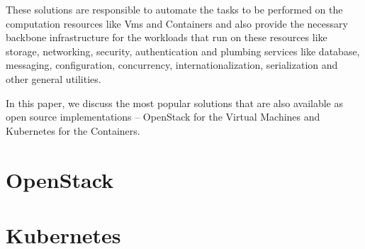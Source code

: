\documentclass[../seminar.tex]{subfiles}
\begin{document}
These solutions are responsible to automate the tasks to be performed on the computation resources like Vms and Containers and also provide the necessary backbone infrastructure for the workloads that run on these resources like storage, networking, security, authentication and plumbing services like database, messaging, configuration, concurrency, internationalization, serialization and other general utilities.

In this paper, we discuss the most popular solutions that are also available as open source implementations – OpenStack for the Virtual Machines and Kubernetes for the Containers.
	
\section{OpenStack}
	

	
\section{Kubernetes}
	

	
\end{document}
